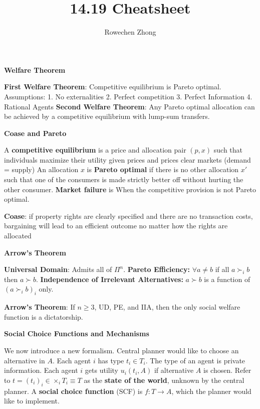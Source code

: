\documentclass[10pt]{scrartcl}
\title{14.19 Cheatsheet}
\author{Rowechen Zhong}
\date{}
\newcommand{\vocab}[1]{\textbf{\color{blue} #1}}
\renewcommand{\section}[1]{\begin{center}\textbf{\color{red}#1}\end{center}}
\begin{document}
\maketitle
\begin{multicols*}{2}
    \section{Welfare Theorem}
    \vocab{First Welfare Theorem}: Competitive equilibrium is Pareto optimal.
    Assumptions:
    1. No externalities 2. Perfect competition 3. Perfect Information 4. Rational Agents
    \vocab{Second Welfare Theorem}: Any Pareto optimal allocation can be achieved
    by a competitive equilibrium with lump-sum transfers.
    
    \section{Coase and Pareto}
    A \vocab{competitive equilibrium} is a price and allocation pair $(p, x)$ such that
    individuals maximize their utility given prices and prices clear markets
    (demand = supply)
    An allocation $x$ is \vocab{Pareto optimal} if there is no other allocation $x'$
    such that one of the consumers is made strictly better off without hurting
    the other consumer.
    \vocab{Market failure} is When the competitive provision is not Pareto optimal.
    
    \vocab{Coase}: if property rights are clearly specified and there are no transaction costs,
    bargaining will lead to an efficient outcome no matter how the rights are
    allocated

    \section{Arrow's Theorem}
    \vocab{Universal Domain}: Admits all of $\Pi^n$.
    \vocab{Pareto Efficiency:} $\forall a\neq b$ if all $a \succ_i b$ then $a\succ b$.
    \vocab{Independence of Irrelevant Alternatives:}
    $a\succ b$ is a function of $\left(a\succ_i b\right)_i$ only.

    \vocab{Arrow's Theorem}: If $n\geq 3$, UD, PE, and IIA,
    then the only social welfare function is a dictatorship.
    \section{Social Choice Functions and Mechanisms}
    We now introduce a new formalism.
    Central planner would like to choose an alternative in $A$.
    Each agent $i$ has type $t_i \in T_i$.
    The type of an agent is private information.
    Each agent $i$ gets utility $u_i(t_i, A)$ if alternative $A$ is chosen.
    Refer to $t = (t_i)_i \in \times_i T_i \equiv T$
    as the \vocab{state of the world}, unknown by the central planner.
    A \vocab{social choice function} (SCF) is $f: T \to A$,
    which the planner would like to implement.


\end{multicols*}
\end{document}

